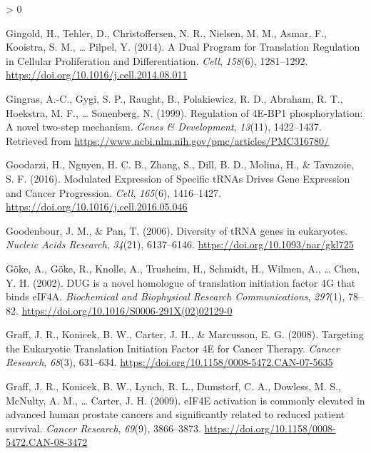\documentclass[
  12pt,
  openany]{book}
\newlength{\cslhangindent}
\newenvironment{CSLReferences}[2] %
 {%
  \setlength{\parindent}{0pt}
  \ifodd #1 \everypar{\setlength{\hangindent}{\cslhangindent}}\ignorespaces\fi
  \ifnum #2 > 0
  \setlength{\parskip}{#2\baselineskip}
  \fi
 }%
 {}
\begin{document}
\begin{CSLReferences}{1}{0}
\leavevmode\hypertarget{ref-Gingold2014}{}%
Gingold, H., Tehler, D., Christoffersen, N. R., Nielsen, M. M., Asmar, F., Kooistra, S. M., \ldots{} Pilpel, Y. (2014). A {Dual Program} for {Translation Regulation} in {Cellular Proliferation} and {Differentiation}. \emph{Cell}, \emph{158}(6), 1281--1292. \url{https://doi.org/10.1016/j.cell.2014.08.011}

\leavevmode\hypertarget{ref-Gingras1999}{}%
Gingras, A.-C., Gygi, S. P., Raught, B., Polakiewicz, R. D., Abraham, R. T., Hoekstra, M. F., \ldots{} Sonenberg, N. (1999). Regulation of {4E}-{BP1} phosphorylation: A novel two-step mechanism. \emph{Genes \& Development}, \emph{13}(11), 1422--1437. Retrieved from \url{https://www.ncbi.nlm.nih.gov/pmc/articles/PMC316780/}

\leavevmode\hypertarget{ref-Goodarzi2016}{}%
Goodarzi, H., Nguyen, H. C. B., Zhang, S., Dill, B. D., Molina, H., \& Tavazoie, S. F. (2016). Modulated {Expression} of {Specific tRNAs Drives Gene Expression} and {Cancer Progression}. \emph{Cell}, \emph{165}(6), 1416--1427. \url{https://doi.org/10.1016/j.cell.2016.05.046}

\leavevmode\hypertarget{ref-Goodenbour2006}{}%
Goodenbour, J. M., \& Pan, T. (2006). Diversity of {tRNA} genes in eukaryotes. \emph{Nucleic Acids Research}, \emph{34}(21), 6137--6146. \url{https://doi.org/10.1093/nar/gkl725}

\leavevmode\hypertarget{ref-Goke2002}{}%
Göke, A., Göke, R., Knolle, A., Trusheim, H., Schmidt, H., Wilmen, A., \ldots{} Chen, Y. H. (2002). {DUG} is a novel homologue of translation initiation factor {4G} that binds {eIF4A}. \emph{Biochemical and Biophysical Research Communications}, \emph{297}(1), 78--82. \url{https://doi.org/10.1016/S0006-291X(02)02129-0}

\leavevmode\hypertarget{ref-Graff2008}{}%
Graff, J. R., Konicek, B. W., Carter, J. H., \& Marcusson, E. G. (2008). Targeting the {Eukaryotic Translation Initiation Factor 4E} for {Cancer Therapy}. \emph{Cancer Research}, \emph{68}(3), 631--634. \url{https://doi.org/10.1158/0008-5472.CAN-07-5635}

\leavevmode\hypertarget{ref-Graff2009}{}%
Graff, J. R., Konicek, B. W., Lynch, R. L., Dumstorf, C. A., Dowless, M. S., McNulty, A. M., \ldots{} Carter, J. H. (2009). {eIF4E} activation is commonly elevated in advanced human prostate cancers and significantly related to reduced patient survival. \emph{Cancer Research}, \emph{69}(9), 3866--3873. \url{https://doi.org/10.1158/0008-5472.CAN-08-3472}


\end{CSLReferences}
\end{document}
